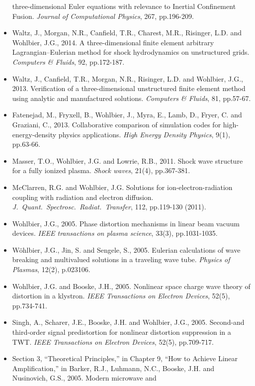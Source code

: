 \documentclass{muratcan_cv}
\begin{document}
\begin{itemize}
  three-dimensional Euler equations with relevance to Inertial
  Confinement Fusion. {\it Journal of Computational Physics}, 267,
  pp.196-209.
\item Waltz, J., Morgan, N.R., Canfield, T.R., Charest, M.R.,
  Risinger, L.D. and Wohlbier, J.G., 2014. A three-dimensional
  finite element arbitrary Lagrangian–Eulerian method for shock
  hydrodynamics on unstructured grids. {\it Computers \& Fluids}, 92,
  pp.172-187.
\item Waltz, J., Canfield, T.R., Morgan, N.R., Risinger, L.D. and
  Wohlbier, J.G., 2013. Verification of a three-dimensional
  unstructured finite element method using analytic and manufactured
  solutions. {\it Computers \& Fluids}, 81, pp.57-67.
\item Fatenejad, M., Fryxell, B., Wohlbier, J., Myra, E., Lamb, D.,
  Fryer, C. and Graziani, C., 2013. Collaborative comparison of
  simulation codes for high-energy-density physics applications. {\it High
  Energy Density Physics}, 9(1), pp.63-66.
\item Masser, T.O., Wohlbier, J.G. and Lowrie, R.B., 2011. Shock wave
  structure for a fully ionized plasma. {\it Shock waves}, 21(4),
  pp.367-381.
\item McClarren, R.G. and Wohlbier, J.G. Solutions for
  ion-electron-radiation coupling with radiation and electron
  diffusion. {\it J.~Quant.~Spectrosc.~Radiat.~Transfer}, 112, pp.119-130
  (2011).
\item Wohlbier, J.G., 2005. Phase distortion mechanisms in linear beam
  vacuum devices. {\it IEEE transactions on plasma science}, 33(3),
  pp.1031-1035.
\item Wöhlbier, J.G., Jin, S. and Sengele, S., 2005. Eulerian
  calculations of wave breaking and multivalued solutions in a
  traveling wave tube. {\it Physics of Plasmas}, 12(2), p.023106.
\item Wohlbier, J.G. and Booske, J.H., 2005. Nonlinear space charge
  wave theory of distortion in a klystron. {\it IEEE Transactions on
  Electron Devices}, 52(5), pp.734-741.
\item Singh, A., Scharer, J.E., Booske, J.H. and Wohlbier, J.G.,
  2005. Second-and third-order signal predistortion for nonlinear
  distortion suppression in a TWT. {\it IEEE Transactions on Electron
    Devices}, 52(5), pp.709-717.
\item Section 3, ``Theoretical Principles,'' in Chapter 9,
  ``How to Achieve Linear Amplification,'' in Barker, R.J., Luhmann,
  N.C., Booske, J.H. and Nusinovich, G.S., 2005. Modern microwave and

\end{itemize}
\end{document}
